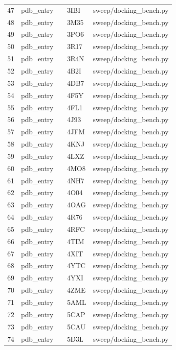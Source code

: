 {\begin{longtable}{rllp{3.2cm}p{4.2cm}}
47 & pdb\_entry &  & 3IBI & sweep/docking\_bench.py\\
48 & pdb\_entry &  & 3M35 & sweep/docking\_bench.py\\
49 & pdb\_entry &  & 3PO6 & sweep/docking\_bench.py\\
50 & pdb\_entry &  & 3R17 & sweep/docking\_bench.py\\
51 & pdb\_entry &  & 3R4N & sweep/docking\_bench.py\\
52 & pdb\_entry &  & 4B2I & sweep/docking\_bench.py\\
53 & pdb\_entry &  & 4DB7 & sweep/docking\_bench.py\\
54 & pdb\_entry &  & 4F5Y & sweep/docking\_bench.py\\
55 & pdb\_entry &  & 4FL1 & sweep/docking\_bench.py\\
56 & pdb\_entry &  & 4J93 & sweep/docking\_bench.py\\
57 & pdb\_entry &  & 4JFM & sweep/docking\_bench.py\\
58 & pdb\_entry &  & 4KNJ & sweep/docking\_bench.py\\
59 & pdb\_entry &  & 4LXZ & sweep/docking\_bench.py\\
60 & pdb\_entry &  & 4MO8 & sweep/docking\_bench.py\\
61 & pdb\_entry &  & 4NH7 & sweep/docking\_bench.py\\
62 & pdb\_entry &  & 4O04 & sweep/docking\_bench.py\\
63 & pdb\_entry &  & 4OAG & sweep/docking\_bench.py\\
64 & pdb\_entry &  & 4R76 & sweep/docking\_bench.py\\
65 & pdb\_entry &  & 4RFC & sweep/docking\_bench.py\\
66 & pdb\_entry &  & 4TIM & sweep/docking\_bench.py\\
67 & pdb\_entry &  & 4XIT & sweep/docking\_bench.py\\
68 & pdb\_entry &  & 4YTC & sweep/docking\_bench.py\\
69 & pdb\_entry &  & 4YXI & sweep/docking\_bench.py\\
70 & pdb\_entry &  & 4ZME & sweep/docking\_bench.py\\
71 & pdb\_entry &  & 5AML & sweep/docking\_bench.py\\
72 & pdb\_entry &  & 5CAP & sweep/docking\_bench.py\\
73 & pdb\_entry &  & 5CAU & sweep/docking\_bench.py\\
74 & pdb\_entry &  & 5D3L & sweep/docking\_bench.py\\

\end{longtable}}
